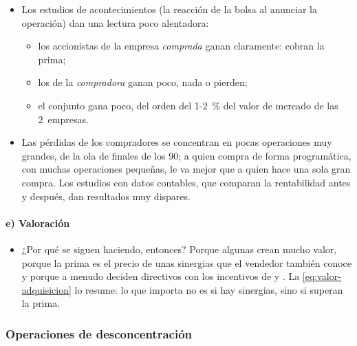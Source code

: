 \documentclass[11pt]{article}
\begin{document}
\begin{itemize}
\item Los estudios de acontecimientos (la reacción de la bolsa al anunciar la operación) dan una lectura poco alentadora\nocite{Pautler2001Evidence,AndradeMitchellStafford2001New,Kaplan2006Mergers}:
  \begin{itemize}
  \item los accionistas de la empresa \emph{comprada} ganan claramente: cobran la prima;
  \item los de la \emph{compradora} ganan poco, nada o pierden;
  \item el conjunto gana poco, del orden del 1-2~\% del valor de mercado de las 2~empresas.
  \end{itemize}
\item Las pérdidas de los compradores se concentran en pocas operaciones muy grandes, de la ola de finales de los 90\nocite{MoellerSchlingemannStulz2005Wealth}; a quien compra de forma programática, con muchas operaciones pequeñas, le va mejor que a quien hace una sola gran compra\nocite{McKinsey2019Programmatic}. Los estudios con datos contables, que comparan la rentabilidad antes y después, dan resultados muy dispares.
\end{itemize}

\paragraph{e) Valoración}

\begin{itemize}
\item ¿Por qué se siguen haciendo, entonces? Porque algunas crean mucho valor, porque la prima es el precio de unas sinergias que el vendedor también conoce y porque a menudo deciden directivos con los incentivos de  y . La \eqref{eq:valor-adquisicion} lo resume: lo que importa no es si hay sinergias, sino si superan la prima.
\end{itemize}

\subsubsection{Operaciones de desconcentración}\label{sec:desconcentracion}
\end{document}
